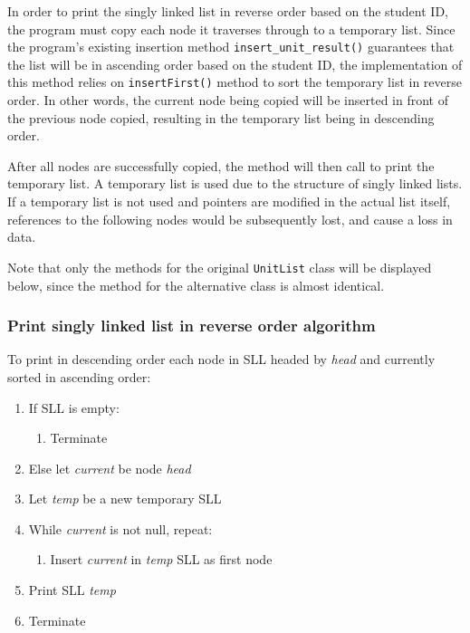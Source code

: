 In order to print the singly linked list in reverse order based on the student ID, the program must copy each node it traverses through to a temporary list. Since the program's existing insertion method \texttt{insert_unit_result()} guarantees that the list will be in ascending order based on the student ID, the implementation of this method relies on \texttt{insertFirst()} method to sort the temporary list in reverse order. In other words, the current node being copied will be inserted in front of the previous node copied, resulting in the temporary list being in descending order.

After all nodes are successfully copied, the method will then call to print the temporary list. A temporary list is used due to the structure of singly linked lists. If a temporary list is not used and pointers are modified in the actual list itself, references to the following nodes would be subsequently lost, and cause a loss in data.

Note that only the methods for the original \texttt{UnitList} class will be displayed below, since the method for the alternative class is almost identical.

\subsubsection{Print singly linked list in reverse order algorithm}

To print in descending order each node in SLL headed by \emph{head} and currently sorted in ascending order:

\begin{enumerate}
\item If SLL is empty:
	\begin{enumerate}
	\item Terminate
	\end{enumerate}
\item Else let \emph{current} be node \emph{head}
\item Let \emph{temp} be a new temporary SLL
\item While \emph{current} is not null, repeat:
	\begin{enumerate}
	\item Insert \emph{current} in \emph{temp} SLL as first node
	\end{enumerate}
\item Print SLL \emph{temp}
\item Terminate
\end{enumerate}

